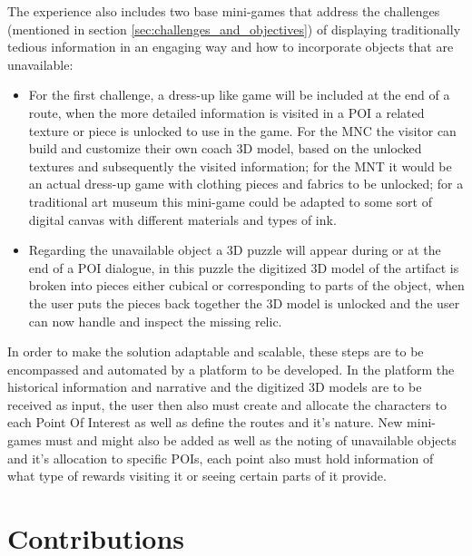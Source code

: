 The experience also includes two base mini-games that address the challenges (mentioned in section \ref{sec:challenges_and_objectives}) of displaying traditionally tedious information
in an engaging way and how to incorporate objects that are unavailable:
\begin{itemize}
  \item For the first challenge, a dress-up like game will be included at the end of a route, when the more detailed information is visited in a POI a related
  texture or piece is unlocked to use in the game. For the MNC the visitor can build and customize their own coach 3D model, based on the unlocked textures and subsequently
  the visited information; for the MNT it would be an actual dress-up game with clothing pieces and fabrics to be unlocked; for a traditional art museum this mini-game
  could be adapted to some sort of digital canvas with different materials and types of ink.
  \item Regarding the unavailable object a 3D puzzle will appear during or at the end of a POI dialogue, in this puzzle the digitized 3D model of the artifact is broken 
  into pieces either cubical or corresponding to parts of the object, when the user puts the pieces back together the 3D model is unlocked and the user can now handle and
  inspect the missing relic.
\end{itemize}

In order to make the solution adaptable and scalable, these steps are to be encompassed and automated by a platform to be developed. In the platform
the historical information and narrative and the digitized 3D models are to be received as input, the user then also must create and allocate the characters to each Point Of Interest
as well as define the routes and it's nature. New mini-games must and might also be added as well as the noting of unavailable objects and it's allocation to specific POIs,
each point also must hold information of what type of rewards visiting it or seeing certain parts of it provide.


\section{Contributions}
\label{sec:contributions}

